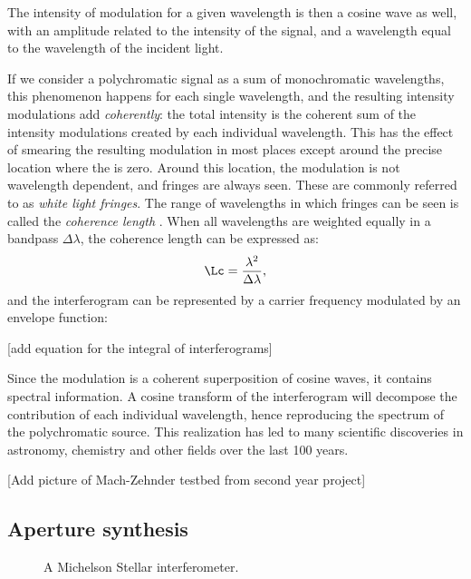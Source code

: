 The intensity of modulation for a given wavelength is then a cosine wave as well, with an amplitude related to the intensity of the signal, and a wavelength equal to the wavelength of the incident light.

If we consider a polychromatic signal as a sum of monochromatic wavelengths, this phenomenon happens for each single wavelength, and the resulting intensity modulations add \textit{coherently}: the total intensity is the coherent sum of the intensity modulations created by each individual wavelength. This has the effect of smearing the resulting modulation in most places except around the precise location where the \OPD is zero. Around this location, the modulation is not wavelength dependent, and fringes are always seen. These are commonly referred to as \textit{white light fringes}. The range of wavelengths in which fringes can be seen is called the \textit{coherence length} \Lc. When all wavelengths are weighted equally in a bandpass $\Delta\lambda$, the coherence length can be expressed as:
\begin{equation}
\Lc = \frac{\lambda^2}{\Delta\lambda},
\end{equation}
and the interferogram can be represented by a carrier frequency modulated by an envelope function:

[add equation for the integral of interferograms]

Since the modulation is a coherent superposition of cosine waves, it contains spectral information. A cosine transform of the interferogram will decompose the contribution of each individual wavelength, hence reproducing the spectrum of the polychromatic source. This realization has led to many scientific discoveries in astronomy, chemistry and other fields over the last 100 years.

[Add picture of Mach-Zehnder testbed from second year project]

\subsection{Aperture synthesis}


\begin{figure}[!h]
	\centering
	
	\caption[Michelson Stellar interferometer]{A Michelson Stellar interferometer.}
	\label{fig:interferometer}
    \end{figure}



